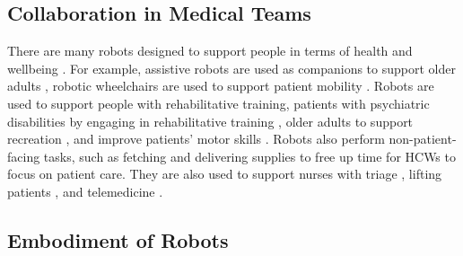 \subsection{Collaboration in Medical Teams}

There are many robots designed to support people in terms of health and wellbeing \cite{kyrarini2021survey,riek2017healthcare}.
For example, assistive robots are used as companions to support older adults \cite{yang2017companion}, robotic wheelchairs are used to support patient mobility \cite{ktistakis2017assistive,jiang2016enhanced}. 
Robots are used to support people with rehabilitative training, patients with psychiatric disabilities by engaging in rehabilitative training \cite{sato2020rehabilitation}, older adults to support recreation  \cite{carros2020exploring}, and improve patients' motor skills \cite{wu2016design}.
Robots also perform non-patient-facing tasks, such as fetching and delivering supplies \cite{ahn2015healthcare,taylor2019coordinating,taylor2021social,taylor2020situating,taylor2021human} to free up time for HCWs to focus on patient care. 
They are also used to support nurses with triage \cite{ahn2015healthcare}, lifting patients \cite{lee2014design}, and telemedicine \cite{matsumoto2023robot}.%






\subsection{Embodiment of Robots}

